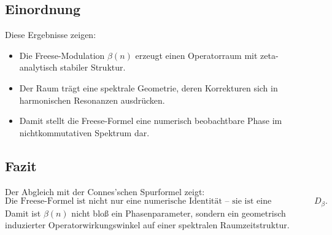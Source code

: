 \subsection*{Einordnung}

Diese Ergebnisse zeigen:

\begin{itemize}
    \item Die Freese-Modulation $\beta(n)$ erzeugt einen Operatorraum mit zeta-analytisch stabiler Struktur.
    \item Der Raum trägt eine spektrale Geometrie, deren Korrekturen sich in harmonischen Resonanzen ausdrücken.
    \item Damit stellt die Freese-Formel eine numerisch beobachtbare Phase im nichtkommutativen Spektrum dar.
\end{itemize}

\subsection*{Fazit}

Der Abgleich mit der Connes’schen Spurformel zeigt:
\[
\text{Die Freese-Formel ist nicht nur eine numerische Identität -- sie ist eine Spurformel über } D_\beta.
\]
Damit ist $\beta(n)$ nicht bloß ein Phasenparameter, sondern ein geometrisch induzierter Operatorwirkungswinkel auf einer spektralen Raumzeitstruktur.